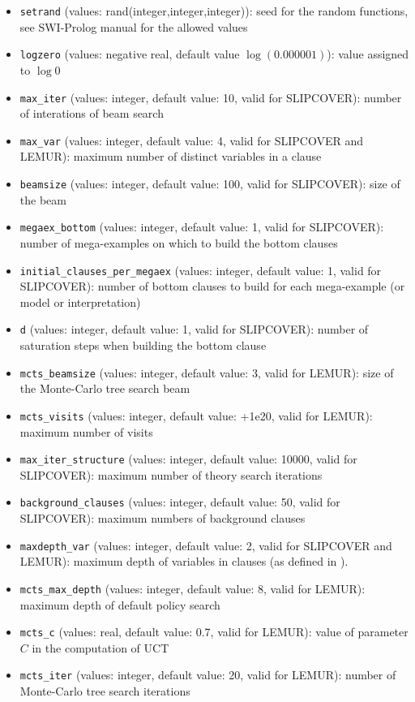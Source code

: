 \begin{itemize}
\item \verb|setrand| (values: rand(integer,integer,integer)): seed for the random functions, see SWI-Prolog manual for the allowed values
\item \verb|logzero| (values: negative real, default value $\log(0.000001)$): value assigned to $\log 0$
\item \verb|max_iter| (values: integer, default value: 10, valid for  SLIPCOVER): number of interations of beam search
\item \verb|max_var| (values: integer, default value: 4, valid for 
SLIPCOVER and LEMUR): maximum number of distinct variables in a clause
\item \verb|beamsize|  (values: integer, default value: 100, valid for SLIPCOVER): size of the beam 
\item \verb|megaex_bottom| (values: integer, default value: 1, valid for SLIPCOVER): number of mega-examples on which to build the bottom clauses
\item \verb|initial_clauses_per_megaex| (values: integer, default value: 1, valid for SLIPCOVER): 
 number of bottom clauses to build for each mega-example (or 
 model or interpretation)
\item \verb|d| (values: integer, default value: 1, valid for SLIPCOVER): 
 number of saturation steps when building the bottom clause
\item \verb|mcts_beamsize|  (values: integer, default value: 3, valid for LEMUR): size of the Monte-Carlo tree search beam
\item \verb|mcts_visits|  (values: integer, default value: +1e20, valid for LEMUR): maximum number of visits 
\item \verb|max_iter_structure| (values: integer, default value: 10000, valid for SLIPCOVER): 
maximum  number of theory search iterations
\item \verb|background_clauses| (values: integer, default value: 50, valid for SLIPCOVER): 
 maximum numbers of background clauses
\item \verb|maxdepth_var| (values: integer, default value: 2, valid for SLIPCOVER and LEMUR): maximum depth of
variables in clauses (as defined in \cite{DBLP:journals/ai/Cohen95}).
\item \verb|mcts_max_depth|  (values: integer, default value: 8, valid for LEMUR): maximum depth of default policy search
\item \verb|mcts_c|  (values: real, default value: 0.7, valid for LEMUR): value of parameter $C$ in the computation of UCT
\item \verb|mcts_iter|  (values: integer, default value: 20, valid for LEMUR): number of Monte-Carlo tree search iterations

\end{itemize}
